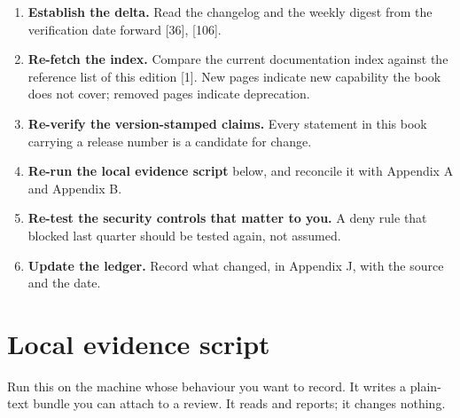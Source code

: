 \documentclass[11pt,a4paper,twoside,openany]{book}
\begin{document}
\begin{enumerate}
\item \textbf{Establish the delta.} Read the changelog and the weekly digest from the verification date forward [36], [106].
\item \textbf{Re-fetch the index.} Compare the current documentation index against the reference list of this edition [1]. New pages indicate new capability the book does not cover; removed pages indicate deprecation.
\item \textbf{Re-verify the version-stamped claims.} Every statement in this book carrying a release number is a candidate for change.
\item \textbf{Re-run the local evidence script} below, and reconcile it with Appendix A and Appendix B.
\item \textbf{Re-test the security controls that matter to you.} A deny rule that blocked last quarter should be tested again, not assumed.
\item \textbf{Update the ledger.} Record what changed, in Appendix J, with the source and the date.
\end{enumerate}

\FloatBarrier
\section*{Local evidence script}

Run this on the machine whose behaviour you want to record. It writes a plain-text bundle you can attach to a review. It reads and reports; it changes nothing.
\end{document}
